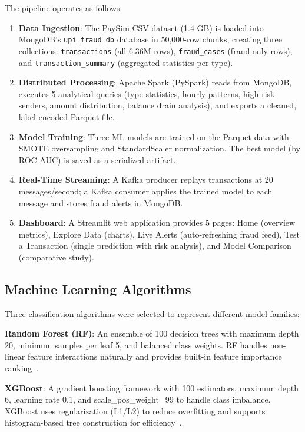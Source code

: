 \documentclass[conference]{IEEEtran}
\begin{document}
The pipeline operates as follows:
\begin{enumerate}
    \item \textbf{Data Ingestion}: The PaySim CSV dataset (1.4 GB) is loaded into MongoDB's \texttt{upi\_fraud\_db} database in 50,000-row chunks, creating three collections: \texttt{transactions} (all 6.36M rows), \texttt{fraud\_cases} (fraud-only rows), and \texttt{transaction\_summary} (aggregated statistics per type).
    \item \textbf{Distributed Processing}: Apache Spark (PySpark) reads from MongoDB, executes 5 analytical queries (type statistics, hourly patterns, high-risk senders, amount distribution, balance drain analysis), and exports a cleaned, label-encoded Parquet file.
    \item \textbf{Model Training}: Three ML models are trained on the Parquet data with SMOTE oversampling and StandardScaler normalization. The best model (by ROC-AUC) is saved as a serialized artifact.
    \item \textbf{Real-Time Streaming}: A Kafka producer replays transactions at 20 messages/second; a Kafka consumer applies the trained model to each message and stores fraud alerts in MongoDB.
    \item \textbf{Dashboard}: A Streamlit web application provides 5 pages: Home (overview metrics), Explore Data (charts), Live Alerts (auto-refreshing fraud feed), Test a Transaction (single prediction with risk analysis), and Model Comparison (comparative study).
\end{enumerate}

\subsection{Machine Learning Algorithms}
Three classification algorithms were selected to represent different model families:

\textbf{Random Forest (RF)}: An ensemble of 100 decision trees with maximum depth 20, minimum samples per leaf 5, and balanced class weights. RF handles non-linear feature interactions naturally and provides built-in feature importance ranking~\cite{breiman2001}.

\textbf{XGBoost}: A gradient boosting framework with 100 estimators, maximum depth 6, learning rate 0.1, and scale\_pos\_weight=99 to handle class imbalance. XGBoost uses regularization (L1/L2) to reduce overfitting and supports histogram-based tree construction for efficiency~\cite{chen2016}.
\end{document}
